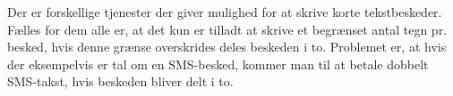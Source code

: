 Der er forskellige tjenester der giver mulighed for at skrive korte tekstbeskeder. Fælles for dem alle er, at det kun er tilladt at skrive et begrænset antal tegn pr. besked, hvis denne grænse overskrides deles beskeden i to. Problemet er, at hvis der eksempelvis er tal om en SMS-besked, kommer man til at betale dobbelt SMS-takst, hvis beskeden bliver delt i to.
